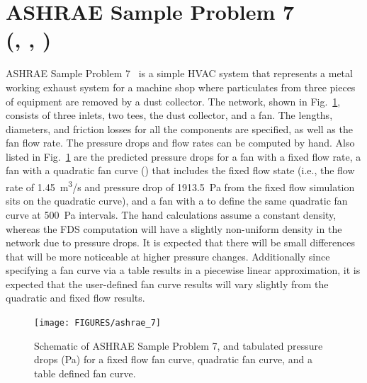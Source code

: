 \documentclass[11pt]{book}
\begin{document}
\FloatBarrier


\section{ASHRAE Sample Problem 7\\(\texorpdfstring{}{ashrae\_7\_fixed\_flow}, \texorpdfstring{}{ashrae\_7\_quadratic}, \texorpdfstring{}{ashrae\_7\_table})}
\label{ashrae7}
\label{ashrae7_fixed_flow}
\label{ashrae7_quadratic}
\label{ashrae7_table}

ASHRAE Sample Problem 7~\cite{ASHRAE} is a simple HVAC system that represents a metal working exhaust system for a machine shop where particulates from three pieces of equipment are removed by a dust collector.  The network, shown in Fig.~\ref{ASHRAE7}, consists of three inlets, two tees, the dust collector, and a fan.  The lengths, diameters, and friction losses for all the components are specified, as well as the fan flow rate. The pressure drops and flow rates can be computed by hand.  Also listed in Fig.~\ref{ASHRAE7} are the predicted pressure drops for a fan with a fixed flow rate, a fan with a quadratic fan curve () that includes the fixed flow state (i.e., the flow rate of 1.45~\si{m^3/s} and pressure drop of 1913.5~Pa from the fixed flow simulation sits on the quadratic curve), and a fan with a  to define the same quadratic fan curve at 500~Pa intervals. The hand calculations assume a constant density, whereas the FDS computation will have a slightly non-uniform density in the network due to pressure drops. It is expected that there will be small differences that will be more noticeable at higher pressure changes.  Additionally since specifying a fan curve via a table results in a piecewise linear approximation, it is expected that the user-defined fan curve results will vary slightly from the quadratic and fixed flow results.


\begin{figure}[ht]
\centering
\texttt{[image: FIGURES/ashrae\_7]}
\caption[Results of  test cases]{Schematic of ASHRAE Sample Problem 7, and tabulated pressure drops (Pa) for a fixed flow fan curve, quadratic fan curve, and a table defined fan curve.}
\label{ASHRAE7}
\end{figure}
\end{document}
